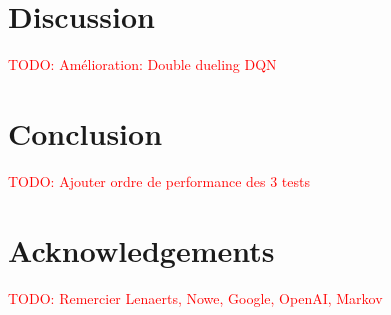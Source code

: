 \documentclass[letterpaper]{article}
\newcommand\todo[1]{\textcolor{red}{TODO: #1}}
\begin{document}
\section{Discussion}

  \todo{Amélioration: Double dueling DQN}~\citep{DBLP:journals/corr/WangFL15}

\section{Conclusion}

	\todo{Ajouter ordre de performance des 3 tests}

\section{Acknowledgements}

  \todo{Remercier Lenaerts, Nowe, Google, OpenAI, Markov}

\newpage
\footnotesize


\end{document}
